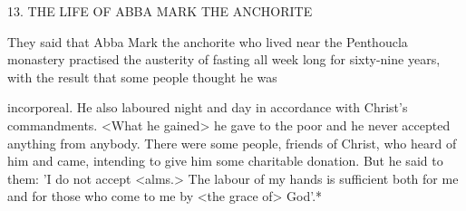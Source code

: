 13. THE LIFE OF ABBA MARK THE ANCHORITE

They said that Abba Mark the anchorite who lived near the
Penthoucla monastery practised the austerity of fasting all week long
for sixty-nine years, with the result that some people thought he was

incorporeal. He also laboured night and day in accordance with
Christ's commandments. <What he gained> he gave to the poor
and he never accepted anything from anybody. There were some
people, friends of Christ, who heard of him and came, intending to
give him some charitable donation. But he said to them: 'I do not
accept <alms.> The labour of my hands is sufficient both for me
and for those who come to me by <the grace of> God'.*

